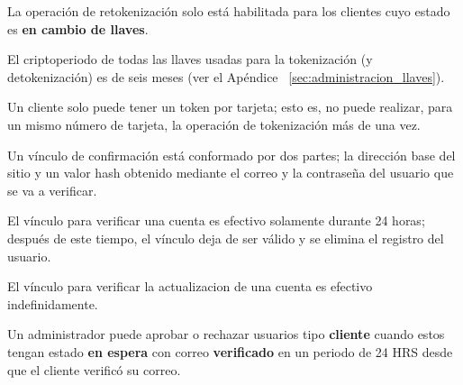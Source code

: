 {
  La operación de retokenización solo está habilitada para los clientes cuyo
  estado es \textbf{en cambio de llaves}.

}

{
  El criptoperiodo de todas las llaves usadas para la tokenización (y
  detokenización) es de seis meses (ver el Apéndice
 ~\ref{sec:administracion_llaves}).
}

{
  Un cliente solo puede tener un token por tarjeta; esto es, no puede realizar,
  para un mismo número de tarjeta, la operación de tokenización más de una vez.
}

{
  Un vínculo de confirmación está conformado por dos partes; la dirección base
  del sitio y un valor hash obtenido mediante el correo y la contraseña del
  usuario que se va a verificar.
}

{
  El vínculo para verificar una cuenta es efectivo solamente durante
  24 horas; después de este tiempo, el vínculo deja de ser válido y se elimina
  el registro del usuario.
}

{
  El vínculo para verificar la actualizacion de una cuenta es efectivo
  indefinidamente.
}

{
  Un administrador puede aprobar o rechazar usuarios tipo \textbf{cliente}
  cuando estos tengan estado \textbf{en espera} con correo \textbf{verificado}
  en un periodo de 24 HRS desde que el cliente verificó su correo.
}

